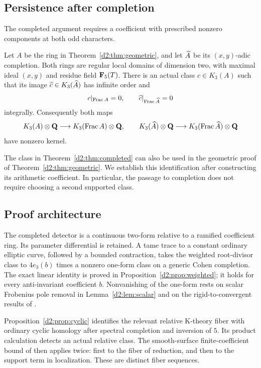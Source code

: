 \subsection{Persistence after completion}

The completed argument requires a coefficient with prescribed nonzero
components at both odd characters.

\begin{theorem}\label{d2:thm:completed}
Let \(A\) be the ring in Theorem~\ref{d2:thm:geometric}, and let
\(\widehat A\) be its \((x,y)\)-adic completion. Both rings are regular local
domains of dimension two, with maximal ideal \((x,y)\) and residue field
\(\mathbf{F} _5(T)\). There is an actual class \(c\in K_3(A)\) such that its image
\(\widehat c\in K_3(\widehat A)\) has infinite order and
\[
 c|_{\operatorname{Frac} A}=0,
 \qquad
 \widehat c|_{\operatorname{Frac}\widehat A}=0
\]
integrally. Consequently both maps
\[
 K_3(A)\otimes\mathbf{Q}\longrightarrow K_3(\operatorname{Frac} A)\otimes\mathbf{Q},
 \qquad
 K_3(\widehat A)\otimes\mathbf{Q}\longrightarrow
 K_3(\operatorname{Frac}\widehat A)\otimes\mathbf{Q}
\]
have nonzero kernel.
\end{theorem}

The class in Theorem~\ref{d2:thm:completed} can also be used in the geometric
proof of Theorem~\ref{d2:thm:geometric}. We establish this identification
after constructing its arithmetic coefficient. In particular, the
passage to completion does not require choosing a second supported
class.

\subsection*{Proof architecture}

The completed detector is a continuous two-form relative to a ramified
coefficient ring. Its parameter differential is retained. A tame trace
to a constant ordinary elliptic curve, followed by a bounded contraction,
takes the weighted root-divisor class to
\(4e_3(b)\) times a nonzero one-form class on a generic Cohen completion.
The exact linear identity is proved in
Proposition~\ref{d2:prop:weighted}; it holds for every anti-invariant
coefficient \(b\). Nonvanishing of the one-form rests on scalar
Frobenius pole removal in Lemma~\ref{d2:lem:scalar} and on the
rigid-to-convergent results of \cite{CaroDAddezio2025}.

Proposition~\ref{d2:prop:cyclic} identifies the relevant relative K-theory
fiber with ordinary cyclic homology after spectral completion and
inversion of \(5\). Its product calculation detects an actual relative
class. The smooth-surface finite-coefficient bound of
\cite[Theorem~8.4]{GeisserLevineCharP} then applies twice: first to the
fiber of reduction, and then to the support term in localization.
These are distinct fiber sequences.

